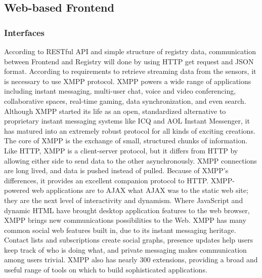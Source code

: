   \subsection{Web-based Frontend}
    \subsubsection{Interfaces}
    According to RESTful API and simple structure of registry data, communication between Frontend and Registry will done by using HTTP get request and JSON format.
    \newline
    According to requirements to retrieve streaming data from the sensors, it is necessary to use XMPP protocol\cite{XMPPbook}.
    XMPP powers a wide range of applications including instant messaging, multi-user chat, voice and video conferencing, collaborative spaces, real-time gaming, data synchronization, and even search. Although XMPP started its life as an open, standardized alternative to proprietary instant messaging systems like ICQ and AOL Instant Messenger, it has matured into an extremely robust protocol for all kinds of exciting creations.
    \newline
    The core of XMPP is the exchange of small, structured chunks of information. Like HTTP, XMPP is a client-server protocol, but it differs from HTTP by allowing either side to send data to the other asynchronously. XMPP connections are long lived, and data is pushed instead of pulled. Because of XMPP’s differences, it provides an excellent companion protocol to HTTP. XMPP-powered web applications are to AJAX what AJAX was to the static web site; they are the next level of interactivity and dynamism. Where JavaScript and dynamic HTML have brought desktop application features to the web browser, XMPP brings new communications possibilities to the Web. XMPP has many common social web features built in, due to its instant messaging heritage. Contact lists and subscriptions create social graphs, presence updates help users keep track of who is doing what, and private messaging makes communication among users trivial. XMPP also has nearly 300 extensions, providing a broad and useful range of tools on which to build sophisticated applications. 
    \newline
